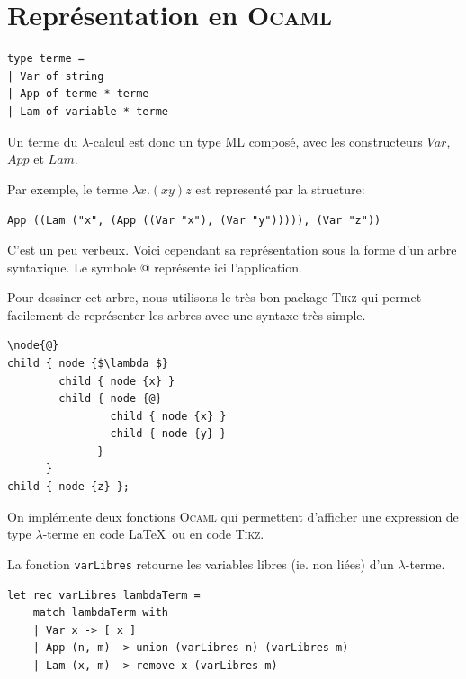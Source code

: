 \section{Représentation en \textsc{Ocaml}}

\begin{Verbatim}
type terme =
| Var of string
| App of terme * terme
| Lam of variable * terme
\end{Verbatim}


Un terme du $\lambda $-calcul est donc un type ML composé, avec les constructeurs $Var$, $App$ et $Lam$.

Par exemple, le terme $ \lambda x.(x y) z $ est representé par la structure:



\texttt{App ((Lam ("x", (App ((Var "x"), (Var "y"))))), (Var "z"))}


C'est un peu verbeux.
Voici cependant sa représentation sous la forme d'un arbre syntaxique. Le symbole @ représente ici l'application.
\begin{center}
\end{center}

Pour dessiner cet arbre, nous utilisons le très bon package \textsc{Tikz} qui permet facilement de représenter
les arbres avec une syntaxe très simple.
\begin{Verbatim}
\node{@}
child { node {$\lambda $}
		child { node {x} }
		child { node {@}
				child { node {x} }
				child { node {y} }
			  }
	  }
child { node {z} };
\end{Verbatim}

On implémente deux fonctions \textsc{Ocaml}
qui permettent  d'afficher une expression de type $\lambda $-terme en code \LaTeX\ ou en code \textsc{Tikz}.


La fonction \texttt{varLibres} retourne les variables libres (ie. non liées) d'un $\lambda $-terme.
\begin{Verbatim}
let rec varLibres lambdaTerm =
	match lambdaTerm with
	| Var x -> [ x ]
	| App (n, m) -> union (varLibres n) (varLibres m)
	| Lam (x, m) -> remove x (varLibres m)
\end{Verbatim}


